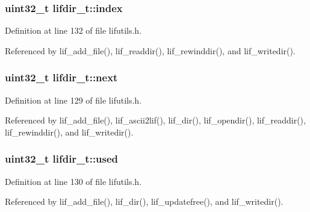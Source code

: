 \subsubsection[{\texorpdfstring{index}{index}}]{\setlength{\rightskip}{0pt plus 5cm}uint32\+\_\+t lifdir\+\_\+t\+::index}\hypertarget{structlifdir__t_a024aa12f9725f9f28875354c16e13d6b}{}\label{structlifdir__t_a024aa12f9725f9f28875354c16e13d6b}


Definition at line 132 of file lifutils.\+h.



Referenced by lif\+\_\+add\+\_\+file(), lif\+\_\+readdir(), lif\+\_\+rewinddir(), and lif\+\_\+writedir().

\subsubsection[{\texorpdfstring{next}{next}}]{\setlength{\rightskip}{0pt plus 5cm}uint32\+\_\+t lifdir\+\_\+t\+::next}\hypertarget{structlifdir__t_a0e0b720a376eb3d13f551626606f46a7}{}\label{structlifdir__t_a0e0b720a376eb3d13f551626606f46a7}


Definition at line 129 of file lifutils.\+h.



Referenced by lif\+\_\+add\+\_\+file(), lif\+\_\+ascii2lif(), lif\+\_\+dir(), lif\+\_\+opendir(), lif\+\_\+readdir(), lif\+\_\+rewinddir(), and lif\+\_\+writedir().

\subsubsection[{\texorpdfstring{used}{used}}]{\setlength{\rightskip}{0pt plus 5cm}uint32\+\_\+t lifdir\+\_\+t\+::used}\hypertarget{structlifdir__t_a70e5c34e0a4be7af60ee5871c45c28df}{}\label{structlifdir__t_a70e5c34e0a4be7af60ee5871c45c28df}


Definition at line 130 of file lifutils.\+h.



Referenced by lif\+\_\+add\+\_\+file(), lif\+\_\+dir(), lif\+\_\+updatefree(), and lif\+\_\+writedir().

